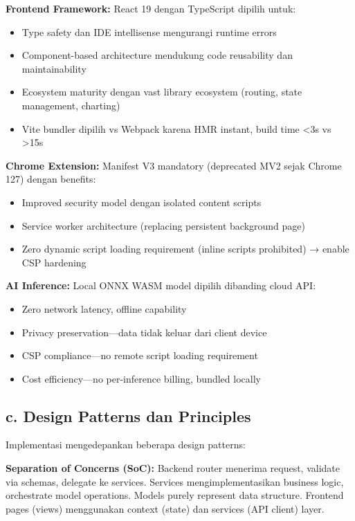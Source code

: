 \documentclass[12pt,a4paper]{article}
\begin{document}
\textbf{Frontend Framework:} React 19 dengan TypeScript dipilih untuk:
\begin{itemize}
  \item Type safety dan IDE intellisense mengurangi runtime errors
  \item Component-based architecture mendukung code reusability dan maintainability
  \item Ecosystem maturity dengan vast library ecosystem (routing, state management, charting)
  \item Vite bundler dipilih vs Webpack karena HMR instant, build time \textless{}3s vs \textgreater{}15s
\end{itemize}

\textbf{Chrome Extension:} Manifest V3 mandatory (deprecated MV2 sejak Chrome 127) dengan benefits:
\begin{itemize}
  \item Improved security model dengan isolated content scripts
  \item Service worker architecture (replacing persistent background page)
  \item Zero dynamic script loading requirement (inline scripts prohibited) → enable CSP hardening
\end{itemize}

\textbf{AI Inference:} Local ONNX WASM model dipilih dibanding cloud API:
\begin{itemize}
  \item Zero network latency, offline capability
  \item Privacy preservation—data tidak keluar dari client device
  \item CSP compliance—no remote script loading requirement
  \item Cost efficiency—no per-inference billing, bundled locally
\end{itemize}

\subsection*{c. Design Patterns dan Principles}

Implementasi mengedepankan beberapa design patterns:

\textbf{Separation of Concerns (SoC):} Backend router menerima request, validate via schemas, delegate ke services. Services mengimplementasikan business logic, orchestrate model operations. Models purely represent data structure. Frontend pages (views) menggunakan context (state) dan services (API client) layer.
\end{document}
